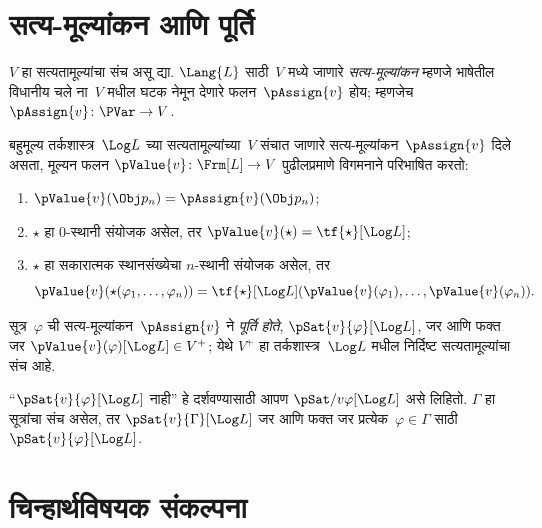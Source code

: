 \section{सत्य-मूल्यांकन आणि पूर्ति}\label{mvl:syn:val:sec}

\begin{defn}[सत्य-मूल्यांकने]
$V$ हा सत्यतामूल्यांचा संच असू द्या. $\Lang{L}$ साठी~$V$
मध्ये जाणारे \emph{सत्य-मूल्यांकन} म्हणजे भाषेतील
विधानीय चले ना~$V$ मधील घटक नेमून
देणारे फलन~$\pAssign{v}$ होय; म्हणजेच
$\pAssign{v} \colon \PVar \to V$.
\end{defn}

\begin{defn}\label{mvl:syn:val:defn:pValue}
  बहुमूल्य तर्कशास्त्र~$\Log L$ च्या सत्यतामूल्यांच्या~$V$
  संचात जाणारे सत्य-मूल्यांकन~$\pAssign{v}$ दिले असता,
  मूल्यन फलन $\pValue{v} \colon \Frm[L] \to V$
  पुढीलप्रमाणे विगमनाने परिभाषित करतो:
  \begin{enumerate}
    \item $\pValue{v}(\Obj p_n) = \pAssign{v}(\Obj p_n)$;
    \item $\star$ हा $0$-स्थानी संयोजक असेल, तर
    $\pValue{v}(\star)  = \tf{\star}[\Log L]$;
    \item $\star$ हा सकारात्मक स्थानसंख्येचा
    $n$-स्थानी संयोजक असेल, तर
    \[      \pValue{v}(\star(\varphi_1, \dots, \varphi_n)) = \tf{\star}[\Log L]
      (\pValue{v}(\varphi_1), \dots, \pValue{v}(\varphi_n)).
    \]
  \end{enumerate}
\end{defn}

\begin{defn}[पूर्ति]
\label{mvl:syn:val:defn:satisfaction} सूत्र~$\varphi$ ची
  सत्य-मूल्यांकन~$\pAssign{v}$ ने \emph{पूर्ति होते},
  $\pSat{v}{\varphi}[\Log L]$, जर आणि फक्त जर
  $\pValue{v}(\varphi)[\Log L] \in V^+$; येथे $V^+$ हा
  तर्कशास्त्र~$\Log L$ मधील निर्दिष्ट सत्यतामूल्यांचा संच आहे.

  ``$\pSat{v}{\varphi}[\Log L]$ नाही'' हे दर्शवण्यासाठी आपण
  $\pSat/{v}{\varphi}[\Log L]$ असे लिहितो. $\Gamma$ हा
  सूत्रांचा संच असेल, तर $\pSat{v}{\Gamma}[\Log L]$
  जर आणि फक्त जर प्रत्येक~$\varphi \in \Gamma$ साठी
  $\pSat{v}{\varphi}[\Log L]$.
\end{defn}












\section{चिन्हार्थविषयक संकल्पना}\label{mvl:syn:sem:sec}

